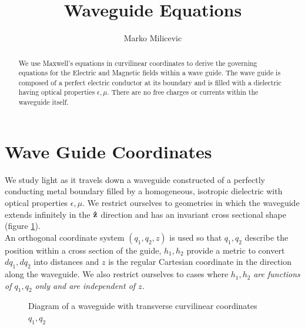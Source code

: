 \documentclass[twoside, a4paper]{article}
\title{Waveguide Equations}
\author{Marko Milicevic}
\date{}	%
\begin{document}
\maketitle

\begin{abstract}
We use Maxwell's equations in curvilinear coordinates to derive the governing equations for the Electric and Magnetic fields within a wave guide. The wave guide is composed of a perfect electric conductor at its boundary and is filled with a dielectric having optical properties $\epsilon, \mu$. There are no free charges or currents within the waveguide itself.
\end{abstract}

\tableofcontents
\newpage

\section{Wave Guide Coordinates}
We study light as it travels down a waveguide constructed of a perfectly conducting metal boundary filled by a homogeneous, isotropic dielectric with optical properties $\epsilon, \mu$. We restrict ourselves to geometries in which the waveguide extends infinitely in the $\mathbf{\hat{z}}$ direction and has an invariant cross sectional shape (figure \ref{fig:wave-guide}).\\

An orthogonal coordinate system $(q_1,q_2,z)$ is used so that $q_1,q_2$ describe the position within a cross section of the guide, $h_1, h_2$ provide a metric to convert $dq_1, dq_2$ into distances and $z$ is the regular Cartesian coordinate in the direction along the waveguide. We also restrict ourselves to cases where $h_1, h_2$ \emph{are functions of $q_1,  q_2$ only and are independent of $z$.}\\
\begin{figure}[htb]
	\centering
	\caption{Diagram of a waveguide with transverse curvilinear coordinates $q_1,q_2$}
	\label{fig:wave-guide}
\end{figure}
\end{document}
